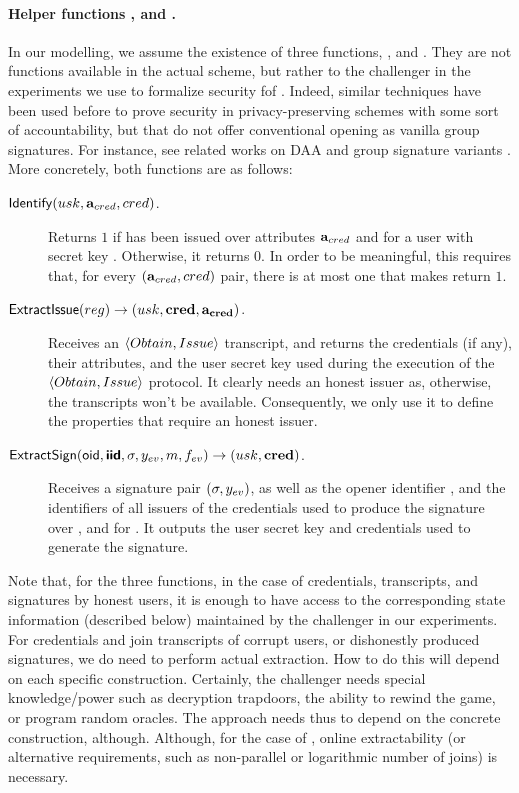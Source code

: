 \paragraph{Helper functions \Identify, \ExtractIssue and \ExtractSign.} In our
modelling, we assume the existence of three functions, \Identify, \ExtractIssue
and \ExtractSign. They are not functions available in the actual scheme, but
rather to the challenger in the experiments we use to formalize security fof
\UAS. Indeed, similar techniques have been used before to prove security in
privacy-preserving schemes with some sort of accountability, but that do not
offer conventional opening as vanilla group signatures. For instance, see
related works on DAA \cite{bfg+11,cdl16} and group signature variants
\cite{dl21,fgl21,gl19,lnpy21}. More concretely, both functions are as follows:

\begin{description}
\item[$\mathsf{Identify}(usk,\mathbf{a}_{cred},cred)$.] Returns $1$ if \cred has been
  issued over attributes $\mathbf{a}_{cred}$ and for a user with secret key \usk.
  Otherwise, it returns $0$. In order to be meaningful, this requires that,
  for every $(\mathbf{a}_{cred},cred)$ pair, there is at most one \usk that makes
  \Identify return $1$.
\item[$\mathsf{ExtractIssue}(reg) \rightarrow (usk,\mathbf{cred},\mathbf{a}_{\mathbf{cred}})$.]
  Receives an $\langle Obtain, Issue \rangle$ transcript, and returns the
  credentials (if any), their attributes, and the user secret key used during
  the execution of the $\langle Obtain,Issue\rangle$ protocol. It clearly needs
  an honest issuer as, otherwise, the transcripts won't be available.
  Consequently, we only use it to define the properties that require an honest
  issuer.
\item[$\mathsf{ExtractSign}(\mathsf{oid},\boldsymbol{\mathsf{\mathsf{iid}}},\sigma,y_{ev},m,f_{ev}) \rightarrow (usk,
  \mathbf{cred})$.] Receives a signature pair $(\sigma,y_{ev})$, as well as the opener
  identifier \oid, and the identifiers of all issuers of the credentials used to
  produce the signature over \msg, and for \feval. It outputs the user secret
  key and credentials used to generate the signature.
\end{description}

Note that, for the three functions, in the case of credentials, transcripts,
and signatures by honest users, it is enough to have access to the corresponding
state information (described below) maintained by the challenger in our
experiments. For credentials and join transcripts of corrupt users, or
dishonestly produced signatures, we do need to perform actual extraction. How to
do this will depend on each specific construction. Certainly, the challenger
needs special knowledge/power such as decryption trapdoors, the ability to
rewind the game, or program random oracles. The approach needs thus to depend on
the concrete construction, although. Although, for the case of \ExtractIssue,
online extractability \needcite (or alternative requirements, such as
non-parallel or logarithmic number of joins) is necessary.

